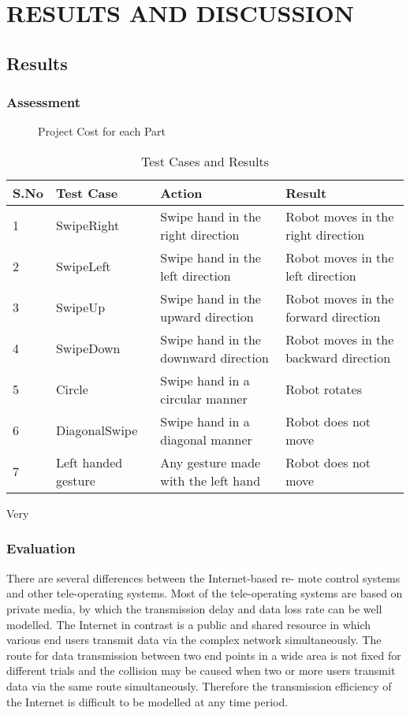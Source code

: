 
\chapter{RESULTS AND DISCUSSION} %

\section{Results}
\subsection{Assessment}


\begin{figure}[H]
  \centering
  \caption{Project Cost for each Part}
  \label{Cost wise Estimate}	
\end{figure}

\begin{table}[H]
    \begin{tabular}{ | l | l | l | p{2cm}|}
    \hline
    S.No & Test Case & Action & Result \\ \hline
    1 & SwipeRight & Swipe hand in the right direction & Robot moves in the right direction \\ \hline
    2 & SwipeLeft &  Swipe hand in the left direction & Robot moves in the left direction \\ \hline
    3 & SwipeUp & Swipe hand in the upward direction & Robot moves in the forward direction \\ \hline
     4 & SwipeDown & Swipe hand in the downward direction & Robot moves in the backward direction \\ \hline
 5 & Circle & Swipe hand in a circular manner & Robot rotates \\ \hline
 6 & DiagonalSwipe & Swipe hand in a diagonal manner & Robot does not move \\ \hline
 7 & Left handed gesture & Any gesture made with the left hand & Robot does not move \\ \hline


    \end{tabular}
\caption{Test Cases and Results}
\label{APT}Very 
\end{table}

\subsection{Evaluation}
There are several differences between the Internet-based re- mote control systems and other tele-operating systems. Most of the tele-operating systems are based on private media, by which the transmission delay and data loss rate can be well modelled. The Internet in contrast is a public and shared resource in which various end users transmit data via the complex network simultaneously. The route for data transmission between two end points in a wide area is not fixed for different trials and the collision may be caused when two or more users transmit data via the same route simultaneously. Therefore the transmission efficiency of the Internet is difficult to be modelled at any time period.

